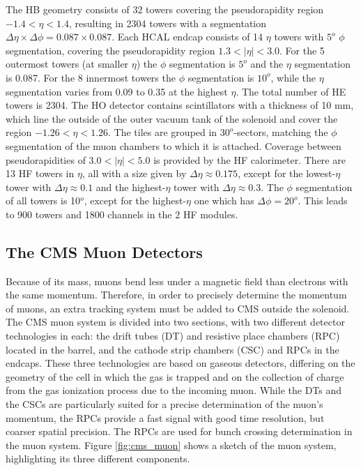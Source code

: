 The HB geometry consists of 32 towers covering the pseudorapidity region $-1.4 < \eta < 1.4$, resulting in 2304 towers with a segmentation $\Delta\eta\times\Delta\phi = 0.087\times0.087$.
Each HCAL endcap consists of 14 $\eta$ towers with $5^{o}$ $\phi$ segmentation, covering the pseudorapidity region $1.3 < |\eta| < 3.0$. 
For the 5 outermost towers (at smaller $\eta$) the $\phi$ segmentation is $5^{o}$ and the $\eta$ segmentation is 0.087. For the 8 innermost towers the $\phi$ segmentation is $10^{o}$, while the $\eta$ segmentation varies from 0.09 to 0.35 at the highest $\eta$. The total number of HE towers is 2304.
The HO detector contains scintillators with a thickness of 10 mm, which line the outside of the outer vacuum tank of the solenoid and cover the region $-1.26 < \eta < 1.26$. The tiles are grouped in $30^{o}$-sectors, matching the $\phi$ segmentation of the muon chambers to which it is attached. 
Coverage between pseudorapidities of $3.0 < |\eta| < 5.0$ is provided by the HF calorimeter. 
There are 13 HF towers in $\eta$, all with a size given by $\Delta\eta\approx0.175$, except for the lowest-$\eta$ tower with $\Delta\eta\approx0.1$ and the highest-$\eta$ tower with $\Delta\eta\approx0.3$. 
The $\phi$ segmentation of all towers is 10$^{o}$, except for the highest-$\eta$ one which has $\Delta\phi= 20^{o}$. 
This leads to 900 towers and 1800 channels in the 2 HF modules.

\subsection{The CMS Muon Detectors}

Because of its mass, muons bend less under a magnetic field than electrons with the same momentum. 
Therefore, in order to precisely determine the momentum of muons, an extra tracking system must be added to CMS outside the solenoid. 
The CMS muon system is divided into two sections, with two different detector technologies in each: the drift tubes (DT) and resistive place chambers (RPC) located in the barrel, and the cathode strip chambers (CSC) and RPCs in the endcaps. 
These three technologies are based on gaseous detectors, differing on the geometry of the cell in which the gas is trapped and on the collection of charge from the gas ionization process due to the incoming muon. 
While the DTs and the CSCs are particularly suited for a precise determination of the muon's momentum, the RPCs provide a fast signal with good time resolution, but coarser spatial precision. 
The RPCs are used for bunch crossing determination in the muon system. 
Figure \ref{fig:cms_muon} shows a sketch of the muon system, highlighting its three different components. 

